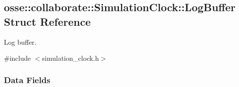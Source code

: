 \hypertarget{structosse_1_1collaborate_1_1_simulation_clock_1_1_log_buffer}{}\subsection{osse\+:\+:collaborate\+:\+:Simulation\+Clock\+:\+:Log\+Buffer Struct Reference}
\label{structosse_1_1collaborate_1_1_simulation_clock_1_1_log_buffer}


Log buffer.  




{\ttfamily \#include $<$simulation\+\_\+clock.\+h$>$}

\subsubsection*{Data Fields}
